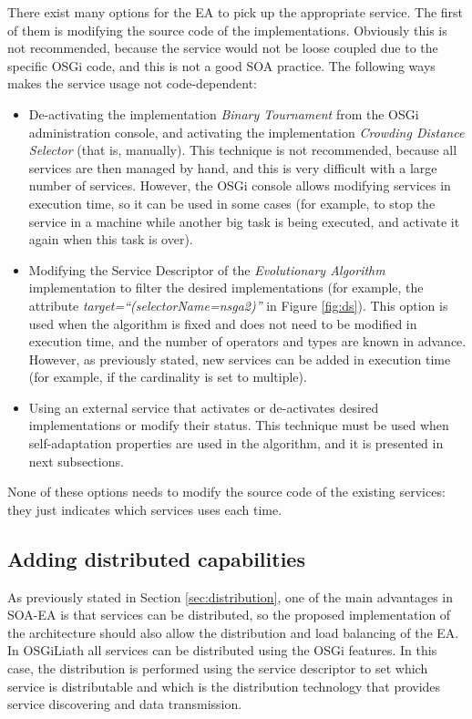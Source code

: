 There exist many options for the EA to pick up the appropriate service. The first of them is modifying the source code of the implementations. Obviously this is not recommended, because the service would not be loose coupled due to the specific OSGi code, and this is not a good SOA practice. The following ways makes the service usage not code-dependent:


\begin{itemize}
\item De-activating the implementation {\em Binary Tournament} from the OSGi administration console, and activating the implementation {\em Crowding Distance Selector} (that is, manually). This technique is not recommended, because all services are then managed by hand, and this is very difficult with a large number of services. However, the OSGi console allows modifying services in execution time, so it can be used in some cases (for example, to stop the service in a machine while another big task is being executed, and activate it again when this task is over).
\item Modifying the Service Descriptor of the {\em Evolutionary Algorithm} implementation to filter the desired implementations (for example, the attribute {\em target\-=``(selectorName\-=nsga2)''} in Figure \ref{fig:ds}). This option is used when the algorithm is fixed and does not need to be modified in execution time, and the number of operators and types are known in advance. However, as previously stated, new services can be added in execution time (for example, if the cardinality is set to multiple).
\item Using an external service that activates or de-activates desired implementations or modify their status. This technique must be used when self-adaptation properties are used in the algorithm, and it is presented in next subsections. 
\end{itemize}


None of these options needs to modify the source code of the existing services: they just indicates which services uses each time.

\subsection{Adding distributed capabilities}

As previously stated in Section \ref{sec:distribution}, one of the main advantages in SOA-EA is that services can be distributed, so the proposed implementation of the architecture  should also allow  the distribution and load balancing of the EA. In OSGiLiath all services can be distributed using the OSGi features. In this case, the distribution is performed using the service descriptor to set which service is distributable and which is the distribution technology that provides service discovering and data transmission.

